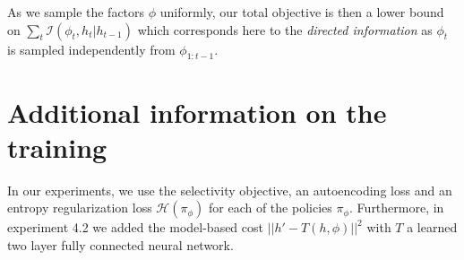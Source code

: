 


As we sample the factors $\phi$ uniformly, our total objective is then a lower bound on $\sum_t \mathcal{I}(\phi_t, h_t | h_{t-1})$ which corresponds here to the \emph{directed information} \citep{massey1990causality} \cite{ziebart2010modeling} as $\phi_t$ is sampled independently from $\phi_{1:t-1}$.


% 


\section{Additional information on the training}

In our experiments, we use the selectivity objective, an autoencoding loss and an entropy regularization loss $\mathcal{H}(\pi_\phi)$ for each of the policies $\pi_\phi$. Furthermore, in experiment 4.2 we added the model-based cost $||h' - T(h, \phi)||^2$ with $T$ a learned two layer fully connected neural network.

